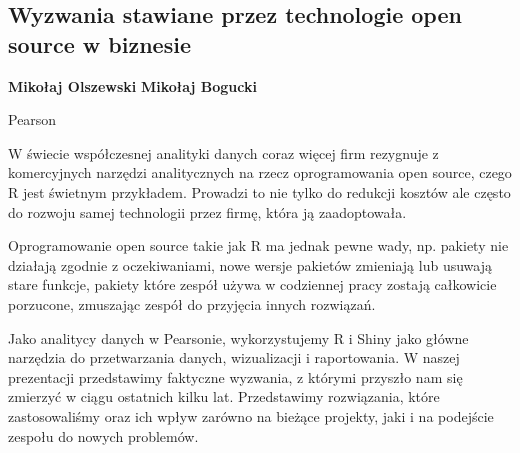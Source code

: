 \documentclass[\main/boa.tex]{subfiles}
\begin{document}
\subsection{Wyzwania stawiane przez technologie open source w biznesie}

\begin{minipage}{0.915\textwidth}
	\centering
  {\bf {} Mikołaj Olszewski}
    {\bf {} Mikołaj Bogucki }
\end{minipage}

\vskip 0.3cm

\begin{affiliations}
\begin{minipage}{0.915\textwidth}
\centering
Pearson \\[-2pt]
\end{minipage}
\end{affiliations}

\vskip 0.8cm

W świecie współczesnej analityki danych coraz więcej firm rezygnuje z komercyjnych narzędzi analitycznych na rzecz oprogramowania open source, czego R jest świetnym przykładem. Prowadzi to nie tylko do redukcji kosztów ale często do rozwoju samej technologii przez firmę, która ją zaadoptowała.

Oprogramowanie open source takie jak R ma jednak pewne wady, np. pakiety nie działają zgodnie z oczekiwaniami, nowe wersje pakietów zmieniają lub usuwają stare funkcje, pakiety które zespół używa w codziennej pracy zostają całkowicie porzucone, zmuszając zespół do przyjęcia innych rozwiązań.

Jako analitycy danych w Pearsonie, wykorzystujemy R i Shiny jako główne narzędzia do przetwarzania danych, wizualizacji i raportowania. W naszej prezentacji przedstawimy faktyczne wyzwania, z którymi przyszło nam się zmierzyć w ciągu ostatnich kilku lat. Przedstawimy rozwiązania, które zastosowaliśmy oraz ich wpływ zarówno na bieżące projekty, jaki i na podejście zespołu do nowych problemów.
\end{document}
